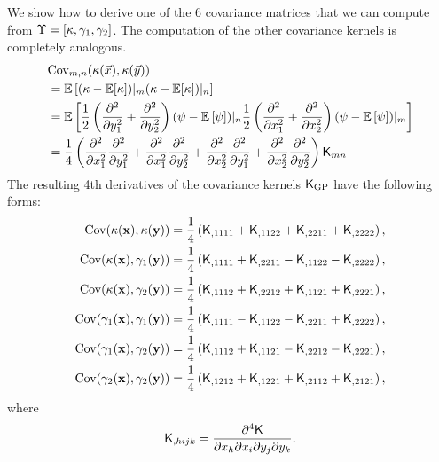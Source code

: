 We show how to derive one of the 6  covariance matrices that we can compute
from $\Upsilon = [\kappa, \gamma_1, \gamma_2]$. The computation of the other
covariance kernels is completely analogous.
\begin{align*}
&{\rm Cov}_{m,n} (\kappa(\vec{x}), \kappa(\vec{y}))  \\ 
&= \mathbb{E} \left[ 
	(\kappa - \mathbb{E}[\kappa])|_m 
( \kappa - \mathbb{E}[\kappa])|_n\right] 
\\
 &=\mathbb{E}\left[
\frac{1}{2} \left(\frac{\partial^2}{\partial y_1^2} + 
\frac{\partial^2}{\partial y_2^2}\right) 
 (\psi - \mathbb{E}\left[\psi\right])|_n \frac{1}{2}
\left(\frac{\partial^2}{\partial x_1^2} + \frac{\partial^2}{\partial x_2^2} \right)
(\psi - \mathbb{E}\left[\psi\right])|_m \right]
\\
&= \frac{1}{4}\left(
\frac{\partial^2}{\partial x_1^2} \frac{\partial^2}{\partial y_1^2} + 
\frac{\partial^2}{\partial x_1^2} \frac{\partial^2}{\partial y_2^2} +  
\frac{\partial^2}{\partial x_2^2} \frac{\partial^2}{\partial y_1^2} + 
\frac{\partial^2}{\partial x_2^2} \frac{\partial^2}{\partial y_2^2}  
\right) \mathsf{K}_{mn}\\ 
\end{align*}
The resulting 4th derivatives of the covariance
kernels $\mathsf{K}_{\rm GP}$ have the following forms: 
\begin{align}
	\mathrm{Cov} (\kappa(\mathbf{x}), \kappa(\mathbf{y}))
&= \frac{1}{4}\left(
\mathsf{K}_{,1111} + \mathsf{K}_{,1122} + \mathsf{K}_{,2211} + \mathsf{K}_{,2222}
\right), \label{eq:kernel_derivatives1}\\
\mathrm{Cov}(\kappa(\mathbf{x}), \gamma_1(\mathbf{y})) &= \frac{1}{4}\left(
\mathsf{K}_{,1111} + \mathsf{K}_{,2211} - \mathsf{K}_{,1122} - \mathsf{K}_{,2222}
\right), \\
\mathrm{Cov}(\kappa(\mathbf{x}), \gamma_2(\mathbf{y})) &= \frac{1}{4}\left(
\mathsf{K}_{,1112} + \mathsf{K}_{,2212} + \mathsf{K}_{,1121} + \mathsf{K}_{,2221}
\right),\\
\mathrm{Cov}(\gamma_1(\mathbf{x}), \gamma_1(\mathbf{y})) &= \frac{1}{4}\left(
\mathsf{K}_{,1111} - \mathsf{K}_{,1122} - \mathsf{K}_{,2211} + \mathsf{K}_{,2222}
\right), \\
\mathrm{Cov}(\gamma_1(\mathbf{x}), \gamma_2(\mathbf{y})) &= \frac{1}{4}\left(
\mathsf{K}_{,1112} + \mathsf{K}_{,1121} - \mathsf{K}_{,2212} - \mathsf{K}_{,2221}
\right), \\
\mathrm{Cov}(\gamma_2(\mathbf{x}), \gamma_2(\mathbf{y})) &= \frac{1}{4}\left(
\mathsf{K}_{,1212} + \mathsf{K}_{,1221} + \mathsf{K}_{,2112} + \mathsf{K}_{,2121}
\right), \label{eq:kernel_derivatives2}
\end{align}
where
\begin{equation}
	\mathsf{K}_{,hijk} = \frac{\partial^4 \mathsf{K}}{\partial x_h \partial x_i
	\partial y_j \partial y_k}.
\end{equation}

